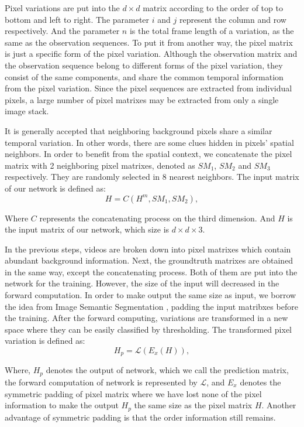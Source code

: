 \documentclass[journal]{IEEEtran}
\begin{document}
Pixel variations are put into the $d\times d$ matrix according to the order of top to bottom and left to right. 
The parameter $i$ and $j$ represent the column and row respectively. 
And the parameter $n$ is the total frame length of a variation, as the same as the observation sequences. 
To put it from another way, the pixel matrix is just a specific form of the pixel variation. 
Although the observation matrix and the observation sequence belong to different forms of the pixel variation, they consist of the same components, and share the common temporal information from the pixel variation. 
Since the pixel sequences are extracted from individual pixels, a large number of pixel matrixes may be extracted from only a single image stack.

It is generally accepted that neighboring background pixels share a similar temporal variation.
In other words, there are some clues hidden in pixels' spatial neighbors. 
In order to benefit from the spatial context, we concatenate the pixel matrix with 2 neighboring pixel matrixes, denoted as $SM_1$, $SM_2$ and $SM_3$ respectively.
They are randomly selected in 8 nearest neighbors. 
The input matrix of our network is defined as:
\begin{equation}
H = C(H^m, SM_1, SM_2),
\end{equation}

Where $C$ represents the concatenating process on the third dimension.
And $H$ is the input matrix of our network, which size is $d\times d\times 3$.

In the previous steps, videos are broken down into pixel matrixes which contain abundant background information. 
Next, the groundtruth matrixes are obtained in the same way, except the concatenating process. 
Both of them are put into the network for the training. 
However, the size of the input will decreased in the forward computation. 
In order to make output the same size as input, we borrow the idea from Image Semantic Segmentation \cite{Shelhamer2017fcn}, padding the input matribxes before the training. 
After the forward computing, variations are transformed in a new space where they can be easily classified by thresholding. 
The transformed pixel variation is defined as:
\begin{equation}
H_p= \mathcal L (E_x (H)),
\end{equation}

Where, $H_p$ denotes the output of network, which we call the prediction matrix, the forward computation of network is represented by $\mathcal L$, and $E_x$ denotes the symmetric padding of pixel matrix where we have lost none of the pixel information to make the output $H_p$ the same size as the pixel matrix $H$. 
Another advantage of symmetric padding is that the order information still remains.
\end{document}
